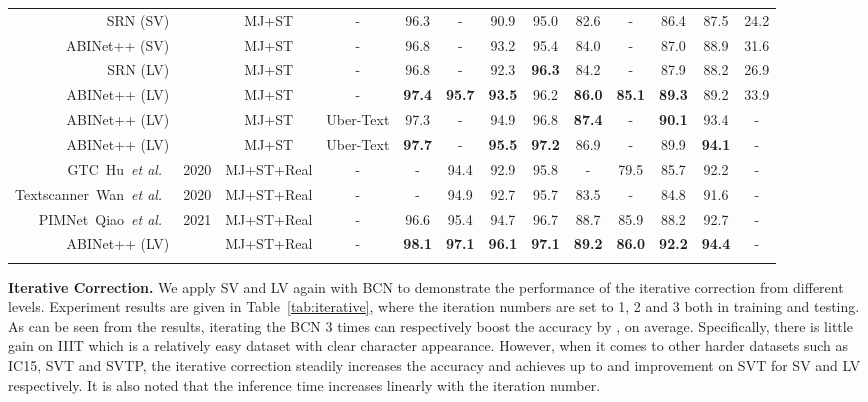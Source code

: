 \documentclass[10pt,journal,compsoc]{IEEEtran}
\def\etal{{\it et al.}\xspace}
\newlength\savedwidth
\newcommand\whline{\noalign{\global\savedwidth\arrayrulewidth
                           \global\arrayrulewidth 0.8pt}\hline
                  \noalign{\global\arrayrulewidth\savedwidth}}
\begin{document}
\begin{table*}[htp]
\begin{center}
{\begin{tabular}{r|c|c|c|c|c|c|c|c|c|c|c|c}
   \hline
   SRN (SV) & &  MJ+ST & - & 96.3 & - & 90.9 & 95.0 & 82.6 & - & 86.4 & 87.5 & 24.2\\
   ABINet++ (SV) & & MJ+ST & - & 96.8 & - & 93.2 &  95.4 & 84.0 & - &  87.0 & 88.9 & 31.6 \\  
   SRN (LV) & &  MJ+ST & - & 96.8 & - & 92.3 & \bf{96.3} & 84.2 & - & 87.9 & 88.2 & 26.9 \\
   ABINet++ (LV) & & MJ+ST & - & \bf{97.4} & \bf{95.7} & \bf{93.5} & 96.2 & \bf{86.0} & \bf{85.1} & \bf{89.3}  & 89.2 & 33.9 \\
   \hline
   ABINet++ (LV) & & MJ+ST & Uber-Text & 97.3 & - & 94.9 & 96.8 & \bf{87.4} & - & \bf{90.1} & 93.4 & - \\
   ABINet++ (LV) & & MJ+ST & Uber-Text & \bf{97.7} & - & \bf{95.5} & \bf{97.2} & 86.9 & - & 89.9  & \bf{94.1} & - \\
   \hline
   GTC~Hu~\etal~\cite{hu2020gtc} & 2020 & MJ+ST+Real & - & - & 94.4 & 92.9 & 95.8 & - & 79.5 & 85.7 & 92.2 & - \\
   Textscanner~Wan~\etal~\cite{wan2019textscanner} & 2020 & MJ+ST+Real & - & - & 94.9 & 92.7 & 95.7 & 83.5 & - & 84.8 & 91.6 & - \\
   PIMNet~Qiao~\etal~\cite{qiao2021pimnet} & 2021 & MJ+ST+Real & - & 96.6 & 95.4 & 94.7 & 96.7 & 88.7 & 85.9 & 88.2 & 92.7 & - \\
   ABINet++ (LV) & & MJ+ST+Real & - & \bf{98.1} & \bf{97.1} & \bf{96.1} & \bf{97.1} & \bf{89.2} & \bf{86.0} & \bf{92.2}  & \bf{94.4} & - \\
   \whline
   \end{tabular}}
   \end{center}
   \vspace{-1.5em}
 \end{table*}


\textbf{Iterative Correction.} We apply SV and LV again with BCN to demonstrate the performance of the iterative correction from different levels. Experiment results are given in Table~\ref{tab:iterative}, where the iteration numbers are set to 1, 2 and 3 both in training and testing. As can be seen from the results, iterating the BCN 3 times can respectively boost the accuracy by ,  on average. Specifically, there is little gain on IIIT which is a relatively easy dataset with clear character appearance. However, when it comes to other harder datasets such as IC15, SVT and SVTP, the iterative correction steadily increases the accuracy and achieves up to  and  improvement on SVT for SV and LV respectively. It is also noted that the inference time increases linearly with the iteration number.
\end{document}
